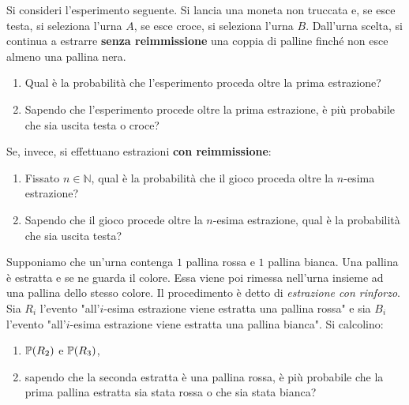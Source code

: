 Si consideri l'esperimento seguente. Si lancia una moneta non truccata e, se esce testa, si seleziona l'urna $A$, se esce croce, si seleziona l'urna $B$. Dall'urna scelta, si continua a estrarre \textbf{senza reimmissione} una coppia di palline finché non esce almeno una pallina nera.
\begin{enumerate}
	\item Qual è la probabilità che l'esperimento proceda oltre la prima estrazione?
	\item Sapendo che l'esperimento procede oltre la prima estrazione, è più probabile che sia uscita testa o croce?
\end{enumerate}
Se, invece, si effettuano estrazioni \textbf{con reimmissione}:
\begin{enumerate}
	\item Fissato $n\in \mathbb{N}$, qual è la probabilità che il gioco proceda oltre la $n$-esima estrazione?
	\item Sapendo che il gioco procede oltre la $n$-esima estrazione, qual è la probabilità che sia uscita testa?
\end{enumerate}


Supponiamo che un'urna contenga $1$ pallina rossa e $1$ pallina bianca. Una pallina è estratta e se ne guarda il colore. Essa viene poi rimessa nell'urna insieme ad una pallina dello stesso colore. Il procedimento è detto di \textit{estrazione con rinforzo}. Sia $R_{i}$ l'evento "all'$i$-esima estrazione viene estratta una pallina rossa" e sia $B_{i}$ l'evento "all'$i$-esima estrazione viene estratta una pallina bianca". Si calcolino:
\begin{enumerate}
	\item $\mathbb{P}( R_{2})$ e $\mathbb{P}( R_{3})$,
	\item sapendo che la seconda estratta è una pallina rossa, è più probabile che la prima pallina estratta sia stata rossa o che sia stata bianca?
\end{enumerate}


